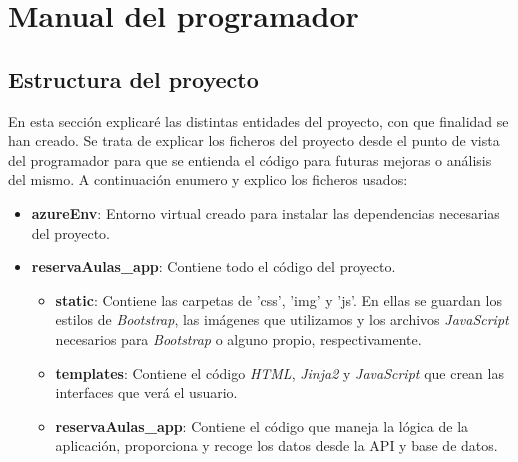 \section{Manual del programador}
\subsection{Estructura del proyecto}
En esta sección explicaré las distintas entidades del proyecto, con que finalidad se han creado. Se trata de explicar los ficheros del proyecto desde el punto de vista del programador para que se entienda el código para futuras mejoras o análisis del mismo. A continuación enumero y explico los ficheros usados:
\begin{itemize}
    \item \textbf{azureEnv}: Entorno virtual creado para instalar las dependencias necesarias del proyecto.
    \item \textbf{reservaAulas\_app}: Contiene todo el código del proyecto.
    \begin{itemize}
        \item \textbf{static}: Contiene las carpetas de 'css', 'img' y 'js'. En ellas se guardan los estilos de \textit{Bootstrap}, las imágenes que utilizamos y los archivos \textit{JavaScript} necesarios para \textit{Bootstrap} o alguno propio, respectivamente.
        \item \textbf{templates}: Contiene el código \textit{HTML}, \textit{Jinja2} y \textit{JavaScript} que crean las interfaces que verá el usuario.
        \item \textbf{reservaAulas\_app}: Contiene el código que maneja la lógica de la aplicación, proporciona y recoge los datos desde la API y base de datos.
    \end{itemize}
\end{itemize}

